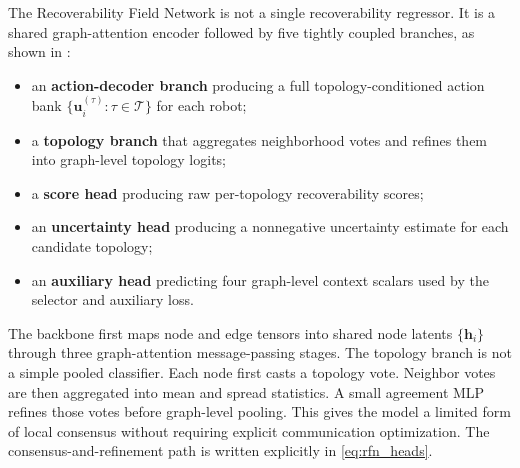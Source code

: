 \documentclass{ieeeaccess}
\newcommand{\cT}{\mathcal{T}}
\newcommand{\bfu}{\mathbf{u}}
\begin{document}
The Recoverability Field Network is not a single recoverability
regressor. It is a shared graph-attention encoder followed by five
tightly coupled branches, as shown in :
\begin{itemize}
    \item an \textbf{action-decoder branch} producing a full topology-conditioned action bank $\{\bfu_i^{(\tau)} : \tau \in \cT\}$ for each robot;
    \item a \textbf{topology branch} that aggregates neighborhood votes and refines them into graph-level topology logits;
    \item a \textbf{score head} producing raw per-topology recoverability scores;
    \item an \textbf{uncertainty head} producing a nonnegative uncertainty estimate for each candidate topology;
    \item an \textbf{auxiliary head} predicting four graph-level context scalars used by the selector and auxiliary loss.
\end{itemize}

The backbone first maps node and edge tensors into shared node latents
$\{\mathbf{h}_i\}$ through three graph-attention message-passing
stages. The topology branch is not a simple pooled classifier. Each
node first casts a topology vote. Neighbor votes are then aggregated
into mean and spread statistics. A small agreement MLP refines those
votes before graph-level pooling. This gives the model a limited form
of local consensus without requiring explicit communication
optimization. The consensus-and-refinement path is written explicitly
in \eqref{eq:rfn_heads}.
\end{document}
